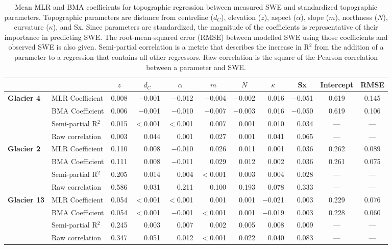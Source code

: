 \documentclass{sfuthesis}
\newcommand{\params}{Topographic parameters are distance from centreline ($d_C$), elevation ($z$), aspect ($\alpha$), slope ($m$), northness ($N$), curvature ($\kappa$), and Sx. }
\begin{document}
\begin{table}
\centering
\caption{Mean MLR and BMA coefficients for topographic regression between measured SWE  and standardized topographic parameters. \params  Since parameters are standardized, the magnitude of the coefficients is representative of their importance in predicting SWE. The root-mean-squared error (RMSE) between modelled SWE using those coefficients and observed SWE is also given. Semi-partial correlation is a metric that describes the increase in R$^2$ from the addition of a parameter to a regression that contains all other regressors. Raw correlation is the square of the Pearson correlation between a parameter and SWE.}
\label{tab:MLRmeancoeff}
\begin{tabular}{ll|rrrrrrrc|c}
 &  & \multicolumn{1}{c}{$z$} & \multicolumn{1}{c}{$d_C$} & \multicolumn{1}{c}{$\alpha$} & \multicolumn{1}{c}{$m$} & \multicolumn{1}{c}{$N$} & \multicolumn{1}{c}{$\kappa$} & \multicolumn{1}{c}{Sx} & Intercept & RMSE \\ \hline \hline
\multirow{4}{*}{\textbf{Glacier 4}} & MLR Coefficient & 0.008 & $-$0.001 & $-$0.012 & $-$0.004 & $-$0.002 & 0.016 & $-$0.051 & 0.619 & 0.145 \\
 & BMA Coefficient & 0.006 & $-$0.001 & $-$0.010 & $-$0.007 & $-$0.003 & 0.016 & $-$0.050 & 0.619 & 0.106 \\
 & Semi-partial R$^2$ & 0.015 & $<$0.001 & $<$0.001 & 0.007 & 0.001 & 0.010 & 0.034 & --- & --- \\
 & Raw correlation & 0.003 & 0.044 & 0.001 & 0.027 & 0.001 & 0.041 & 0.065 & --- & --- \\ \hline
\multirow{4}{*}{\textbf{Glacier 2}} & MLR Coefficient & 0.110 & 0.008 & $-$0.010 & 0.026 & 0.011 & 0.001 & 0.036 & 0.262 & 0.089 \\
 & BMA Coefficient & 0.111 & 0.008 & $-$0.011 & 0.029 & 0.012 & 0.002 & 0.036 & 0.261 & 0.075 \\
 & Semi-partial R$^2$ & 0.205 & 0.014 & 0.004 & $<$0.001 & 0.003 & 0.004 & 0.028 & --- & --- \\
 & Raw correlation & 0.586 & 0.031 & 0.211 & 0.100 & 0.193 & 0.078 & 0.333 & --- & --- \\ \hline
\multirow{4}{*}{\textbf{Glacier 13}} & MLR Coefficient & 0.054 & $<$0.001 & $<$0.001 & 0.001 & 0.001 & $-$0.021 & 0.003 & 0.229 & 0.076 \\
 & BMA Coefficient & 0.054 & $<$0.001 & $-$0.001 & $<$0.001 & 0.001 & $-$0.019 & 0.003 & 0.228 & 0.060 \\
 & Semi-partial R$^2$ & 0.245 & 0.003 & 0.007 & 0.002 & 0.005 & 0.008 & 0.009 & --- & --- \\
 & Raw correlation & 0.347 & 0.051 & 0.012 & $<$0.001 & 0.022 & 0.040 & 0.083 & --- & ---
\end{tabular}
\end{table}
\end{document}
